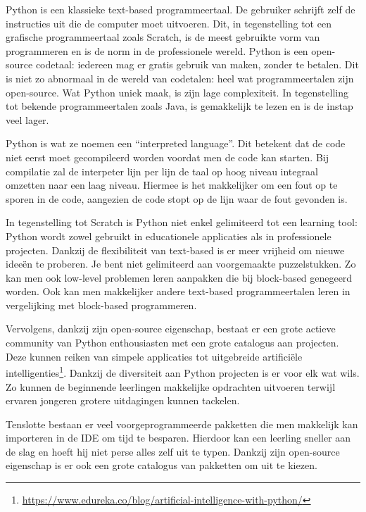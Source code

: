 Python is een klassieke text-based programmeertaal. De gebruiker schrijft zelf de instructies uit die de computer moet uitvoeren. Dit, in tegenstelling tot een grafische programmeertaal zoals Scratch, is de meest gebruikte vorm van programmeren en is de norm in de professionele wereld. Python is een open-source codetaal: iedereen mag er gratis gebruik van maken, zonder te betalen. Dit is niet zo abnormaal in de wereld van codetalen: heel wat programmeertalen zijn open-source. Wat Python uniek maak, is zijn lage complexiteit. In tegenstelling tot bekende programmeertalen zoals Java, is gemakkelijk te lezen en is de instap veel lager. 

Python is wat ze noemen een “interpreted language”. Dit betekent dat de code niet eerst moet gecompileerd worden voordat men de code kan starten. Bij compilatie zal de interpeter lijn per lijn de taal op hoog niveau integraal omzetten naar een laag niveau. Hiermee is het makkelijker om een fout op te sporen in de code, aangezien de code stopt op de lijn waar de fout gevonden is. \cite{Karani2020}

In tegenstelling tot Scratch is Python niet enkel gelimiteerd tot een learning tool: Python wordt zowel gebruikt in educationele applicaties als in professionele projecten. Dankzij de flexibiliteit van text-based is er meer vrijheid om nieuwe ideeën te proberen. Je bent niet gelimiteerd aan voorgemaakte puzzelstukken. Zo kan men ook low-level problemen leren aanpakken die bij block-based genegeerd worden. Ook kan men makkelijker andere text-based programmeertalen leren in vergelijking met block-based programmeren.

Vervolgens, dankzij zijn open-source eigenschap, bestaat er een grote actieve community van Python enthousiasten met een grote catalogus aan projecten. Deze kunnen reiken van simpele applicaties tot uitgebreide artificiële intelligenties\footnote{\url{https://www.edureka.co/blog/artificial-intelligence-with-python/}}. Dankzij de diversiteit aan Python projecten is er voor elk wat wils. Zo kunnen de beginnende leerlingen makkelijke opdrachten uitvoeren terwijl ervaren jongeren grotere uitdagingen kunnen tackelen. 

Tenslotte bestaan er veel voorgeprogrammeerde pakketten die men makkelijk kan importeren in de IDE om tijd te besparen. Hierdoor kan een leerling sneller aan de slag en hoeft hij niet perse alles zelf uit te typen. Dankzij zijn open-source eigenschap is er ook een grote catalogus van pakketten om uit te kiezen.

